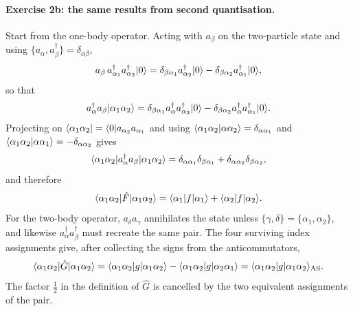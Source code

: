 \paragraph{Exercise 2b: the same results from second quantisation.}
Start from the one-body operator.  Acting with $a_{\beta}$ on the two-particle
state and using $\{a_{\alpha},a^{\dagger}_{\beta}\}=\delta_{\alpha\beta}$,
\begin{equation}
  a_{\beta}\,a^{\dagger}_{\alpha_1}a^{\dagger}_{\alpha_2}\vert 0 \rangle
   = \delta_{\beta\alpha_1}a^{\dagger}_{\alpha_2}\vert 0 \rangle
   - \delta_{\beta\alpha_2}a^{\dagger}_{\alpha_1}\vert 0 \rangle ,
  \label{eq:2-w36b2q1}
\end{equation}
so that
\begin{equation}
  a^{\dagger}_{\alpha}a_{\beta}\vert \alpha_1\alpha_2 \rangle
   = \delta_{\beta\alpha_1}a^{\dagger}_{\alpha}a^{\dagger}_{\alpha_2}\vert 0 \rangle
   - \delta_{\beta\alpha_2}a^{\dagger}_{\alpha}a^{\dagger}_{\alpha_1}\vert 0 \rangle .
  \label{eq:2-w36b2q2}
\end{equation}
Projecting on $\langle \alpha_1\alpha_2 \vert=\langle 0 \vert a_{\alpha_2}a_{\alpha_1}$ and
using $\langle \alpha_1\alpha_2 \vert \alpha\alpha_2 \rangle=\delta_{\alpha\alpha_1}$ and
$\langle \alpha_1\alpha_2 \vert \alpha\alpha_1 \rangle=-\delta_{\alpha\alpha_2}$ gives
\begin{equation}
  \langle \alpha_1\alpha_2 | a^{\dagger}_{\alpha}a_{\beta} | \alpha_1\alpha_2 \rangle
   = \delta_{\alpha\alpha_1}\delta_{\beta\alpha_1}
   + \delta_{\alpha\alpha_2}\delta_{\beta\alpha_2} ,
  \label{eq:2-w36b2q3}
\end{equation}
and therefore
\begin{equation}
  \langle \alpha_1\alpha_2 | \hat{F} | \alpha_1\alpha_2 \rangle
   = \langle\alpha_1|f|\alpha_1\rangle + \langle\alpha_2|f|\alpha_2\rangle .
  \label{eq:2-w36b2q4}
\end{equation}
For the two-body operator, $a_{\delta}a_{\gamma}$ annihilates the state unless
$\{\gamma,\delta\}=\{\alpha_1,\alpha_2\}$, and likewise
$a^{\dagger}_{\alpha}a^{\dagger}_{\beta}$ must recreate the same pair.  The
four surviving index assignments give, after collecting the signs from the
anticommutators,
\begin{equation}
  \langle \alpha_1\alpha_2 | \hat{G} | \alpha_1\alpha_2 \rangle
   = \langle\alpha_1\alpha_2|g|\alpha_1\alpha_2\rangle
   - \langle\alpha_1\alpha_2|g|\alpha_2\alpha_1\rangle
   = \langle\alpha_1\alpha_2|g|\alpha_1\alpha_2\rangle_{\mathrm{AS}} .
  \label{eq:2-w36b2q5}
\end{equation}
The factor $\tfrac12$ in the definition of $\hat{G}$ is cancelled by the two
equivalent assignments of the pair.

